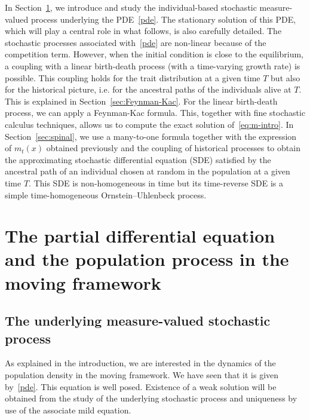 \documentclass[AHL,Unicode,longabstracts,published]{cedram}
\begin{document}
In Section~\ref{sec:PDE}, we introduce and study the individual-based stochastic measure-valued process underlying the PDE~\eqref{pde}. The stationary solution of this PDE, which will play a central role in what follows, is also carefully detailed. The stochastic processes associated with~\eqref{pde} are non-linear because of the competition term. However, when the initial condition is close to the equilibrium, a coupling with a linear birth-death process (with a time-varying growth rate) is possible. This coupling holds for the trait distribution at a given time $T$ but also for the historical picture, i.e. for the ancestral paths of the individuals alive at $T$. This is explained in Section~\ref{sec:Feynman-Kac}. For the linear birth-death process, we can apply a Feynman-Kac formula. This, together with fine stochastic calculus techniques, allows us to compute the exact solution of~\eqref{eq:m-intro}. In Section~\ref{sec:spinal}, we use a many-to-one formula together with the expression of $m_t(x)$ obtained previously and the coupling of historical processes to obtain the approximating stochastic differential equation (SDE) satisfied by the ancestral path of an individual chosen at random in the population at a given time $T$. This SDE is non-homogeneous in time but its time-reverse SDE is a simple time-homogeneous Ornstein--Uhlenbeck process.


\section{The partial differential equation and the population process in the moving framework}\label{sec:PDE}

\subsection{The underlying measure-valued stochastic process}\label{sec:measure-valued-sto-pro}

As explained in the introduction, we are interested in the dynamics of the population density in the moving framework. We have seen that it is given by~\eqref{pde}. This equation is well posed. Existence of a weak solution will be obtained from the study of the underlying stochastic process and uniqueness by use of the associate mild equation.

\end{document}
